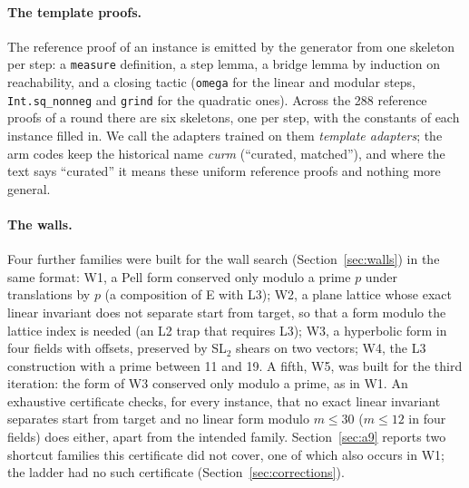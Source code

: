 \documentclass[11pt]{article}
\begin{document}
\paragraph{The template proofs.} The reference proof of an instance is
emitted by the generator from one skeleton per step: a \texttt{measure}
definition, a step lemma, a bridge lemma by induction on reachability, and
a closing tactic (\texttt{omega} for the linear and modular steps,
\texttt{Int.sq\_nonneg} and \texttt{grind} for the quadratic ones). Across
the 288 reference proofs of a round there are six skeletons, one per step,
with the constants of each instance filled in. We call the adapters
trained on them \emph{template adapters}; the arm codes keep the
historical name \emph{curm} (``curated, matched''), and where the text
says ``curated'' it means these uniform reference proofs and nothing more
general.

\paragraph{The walls.} Four further families were built for the wall
search (Section~\ref{sec:walls}) in the same format: W1, a Pell form
conserved only modulo a prime $p$ under translations by $p$ (a composition
of E with L3); W2, a plane lattice whose exact linear invariant does not
separate start from target, so that a form modulo the lattice index is
needed (an L2 trap that requires L3); W3, a hyperbolic form in four fields
with offsets, preserved by SL$_2$ shears on two vectors; W4, the L3
construction with a prime between 11 and 19. A fifth, W5, was built for
the third iteration: the form of W3 conserved only modulo a prime, as in
W1. An exhaustive certificate checks, for every instance, that no exact
linear invariant separates start from target and no linear form modulo
$m\le30$ ($m\le12$ in four fields) does either, apart from the intended
family. Section~\ref{sec:a9} reports two shortcut families this
certificate did not cover, one of which also occurs in W1; the ladder had
no such certificate (Section~\ref{sec:corrections}).
\end{document}

